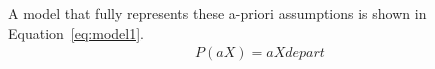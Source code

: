 A model that fully represents these a-priori assumptions is shown in Equation~\ref{eq:model1}.
\begin{align}
    P(aX) = aXdepart
\end{align}
